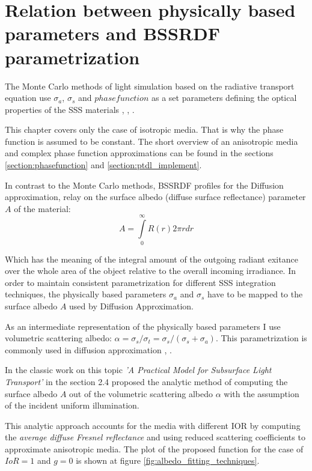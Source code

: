\section{Relation between physically based parameters and BSSRDF parametrization}
\label{section:cb_parametrization}
The Monte Carlo methods of light simulation based on the radiative transport equation use
$\sigma_a$, $\sigma_s$ and $phase function$ as a set parameters defining the optical properties of
the SSS materials \cite{chandrasekhar1960radiative}, \cite{pharr2010physically},
\cite{Jensen:2001:PMS:383259.383319}.

This chapter covers only the case of isotropic media. That is why the phase function is assumed to
be constant. The short overview of an anisotropic media and complex phase function approximations
can be found in the sections \ref{section:phasefunction} and \ref{section:ptdl_implement}.

In contrast to the Monte Carlo methods, BSSRDF profiles for the Diffusion approximation, relay on
the surface albedo (diffuse surface reflectance) parameter $A$ of the material:
\[ A = \int\limits_0^\infty R(r)2\pi r dr \]

Which has the meaning of the integral amount of the outgoing radiant exitance over the whole area of
the object relative to the overall incoming irradiance. In order to maintain consistent
parametrization for different SSS integration techniques, the physically based parameters $\sigma_a$
and $\sigma_s$ have to be mapped to the surface albedo $A$ used by Diffusion Approximation.

As an intermediate representation of the physically based parameters I use volumetric scattering
albedo: $\alpha = \sigma_s/\sigma_t = \sigma_s/(\sigma_s + \sigma_a)$. This parametrization is
commonly used in diffusion approximation \cite{Jensen:2002:RHR:566570.566619},
\cite{Donner:2009:EBM}.

In the classic work on this topic \emph{'A Practical Model for Subsurface Light Transport'} in the
section 2.4 \cite{Jensen:2001:PMS:383259.383319} proposed the analytic method of computing the
surface albedo $A$ out of the volumetric scattering albedo $\alpha$ with the assumption of the
incident uniform illumination.

This analytic approach accounts for the media with different \gls{IOR} by computing the
\emph{average diffuse Fresnel reflectance} and using reduced scattering coefficients to approximate
anisotropic media. The plot of the proposed function for the case of $IoR=1$ and $g=0$ is shown at
figure \ref{fig:albedo_fitting_techniques}.

